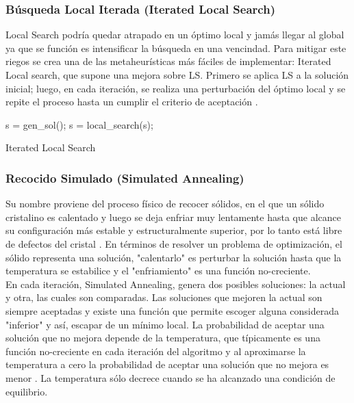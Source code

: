 \documentclass{ci5652}
\begin{document}

\subsubsection{Búsqueda Local Iterada (Iterated Local Search)}

Local Search podría quedar atrapado en un óptimo local y jamás llegar al global ya que se función es intensificar la búsqueda en una vencindad. Para mitigar
este riegos se crea una de las metaheurísticas más fáciles de implementar:
Iterated Local search, que supone una mejora sobre LS. Primero se aplica LS a la
solución inicial; luego, en cada iteración, se realiza una perturbación del
óptimo local y se repite el proceso hasta un cumplir el criterio de aceptación
\cite{Talbi_2009}.\\

\begin{algorithm}
 \DontPrintSemicolon
 \vspace*{0.1cm}
  s = gen\_sol();\;
  s = local\_search(s);\;
 \vspace*{0.1cm}
 \caption{Iterated Local Search}
\end{algorithm}



\subsubsection{Recocido Simulado (Simulated Annealing)}

Su nombre proviene del proceso físico de recocer sólidos, en el que un sólido
cristalino es calentado y luego se deja enfriar muy lentamente hasta que alcance
su configuración más estable y estructuralmente superior, por lo tanto está
libre de defectos del cristal \cite{Glover_2003}. En términos de resolver un
problema de optimización, el sólido representa una solución, "calentarlo" es
perturbar la solución hasta que la temperatura se estabilice y el "enfriamiento"
es una función no-creciente.\\

En cada iteración, Simulated Annealing, genera dos posibles soluciones: la
actual y otra, las cuales son comparadas. Las soluciones que mejoren la actual
son siempre aceptadas y existe una función que permite escoger alguna
considerada "inferior" y así, escapar de un mínimo local. La probabilidad de
aceptar una solución que no mejora depende de la temperatura, que típicamente es
una función no-creciente en cada iteración del algoritmo y al aproximarse la
temperatura a cero la probabilidad de aceptar una solución que no mejora es
menor \cite{Glover_2003}. La temperatura sólo decrece cuando se ha alcanzado una
condición de equilibrio.\\
\end{document}
